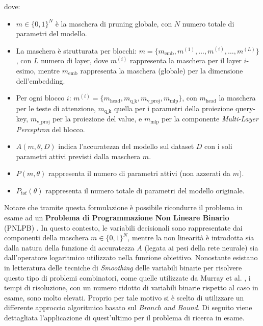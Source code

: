 dove:
\begin{itemize}
    \item $m \in \{0, 1\}^N$ è la maschera di pruning globale, con $N$ numero totale di parametri del modello.
    \item La maschera è strutturata per blocchi: $m = \{m_{\mathrm{emb}}, m^{(1)}, \dots,
              m^{(i)}, \dots, m^{(L)}\}$, con $L$ numero di layer, dove $m^{(i)}$ rappresenta
          la maschera per il layer $i$-esimo, mentre $m_{\mathrm{emb}}$ rappresenta la
          maschera (globale) per la dimensione dell'embedding.
    \item Per ogni blocco $i$: $m^{(i)} = \{m_{\mathrm{head}}, m_{\mathrm{q\_k}},
              m_{\mathrm{v\_proj}}, m_{\mathrm{mlp}}\}$, con $m_{\mathrm{head}}$ la maschera
          per le teste di attenzione, $m_{\mathrm{q\_k}}$ quella per i parametri della
          proiezione query-key, $m_{\mathrm{v\_proj}}$ per la proiezione del value, e
          $m_{\mathrm{mlp}}$ per la componente \textit{Multi-Layer Perceptron} del
          blocco.
    \item ${A}(m, \theta, D)$ indica l'accuratezza del modello sul dataset $D$ con i soli parametri attivi previsti dalla maschera $m$.
    \item ${P}(m, \theta)$ rappresenta il numero di parametri attivi (non azzerati da $m$).
    \item ${P}_{tot}(\theta)$ rappresenta il numero totale di parametri del modello originale.
\end{itemize}
Notare che tramite questa formulazione è possibile ricondurre il problema in esame ad un \textbf{Problema di Programmazione Non Lineare Binario} (PNLPB) \cite{BOROS2002155}. In questo contesto, le variabili decisionali sono rappresentate dai componenti della maschera $m \in \{0, 1\}^N$, mentre la non linearità è introdotta sia dalla natura della funzione di accuratezza ${A}$ (legata ai pesi della rete neurale) sia dall'operatore logaritmico utilizzato nella funzione obiettivo. Nonostante esistano in letteratura delle tecniche di \textit{Smoothing} delle variabili binarie per risolvere questo tipo di problemi combinatori, come quelle utilizzate da Murray et al. \cite{nonlinear_optim}, i tempi di risoluzione, con un numero ridotto di variabili binarie rispetto al caso in esame, sono molto elevati. Proprio per tale motivo si è scelto di utilizzare un differente approccio algoritmico basato sul \textit{Branch and Bound}. Di seguito viene dettagliata l'applicazione di quest'ultimo per il problema di ricerca in esame.

